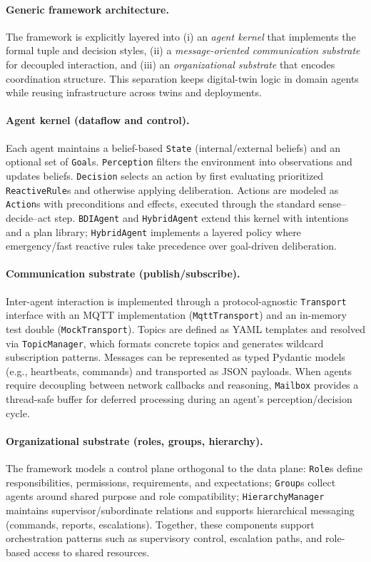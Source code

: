 \paragraph{Generic framework architecture.} The framework is explicitly layered into (i) an \emph{agent kernel} that implements the formal tuple and decision styles, (ii) a \emph{message-oriented communication substrate} for decoupled interaction, and (iii) an \emph{organizational substrate} that encodes coordination structure. This separation keeps digital-twin logic in domain agents while reusing infrastructure across twins and deployments.

\paragraph{Agent kernel (dataflow and control).} Each agent maintains a belief-based \texttt{State} (internal/external beliefs) and an optional set of \texttt{Goal}s. \texttt{Perception} filters the environment into observations and updates beliefs. \texttt{Decision} selects an action by first evaluating prioritized \texttt{ReactiveRule}s and otherwise applying deliberation. Actions are modeled as \texttt{Action}s with preconditions and effects, executed through the standard sense--decide--act step. \texttt{BDIAgent} and \texttt{HybridAgent} extend this kernel with intentions and a plan library; \texttt{HybridAgent} implements a layered policy where emergency/fast reactive rules take precedence over goal-driven deliberation.

\paragraph{Communication substrate (publish/subscribe).} Inter-agent interaction is implemented through a protocol-agnostic \texttt{Transport} interface with an MQTT implementation (\texttt{MqttTransport}) and an in-memory test double (\texttt{MockTransport}). Topics are defined as YAML templates and resolved via \texttt{TopicManager}, which formats concrete topics and generates wildcard subscription patterns. Messages can be represented as typed Pydantic models (e.g., heartbeats, commands) and transported as JSON payloads. When agents require decoupling between network callbacks and reasoning, \texttt{Mailbox} provides a thread-safe buffer for deferred processing during an agent’s perception/decision cycle.

\paragraph{Organizational substrate (roles, groups, hierarchy).} The framework models a control plane orthogonal to the data plane: \texttt{Role}s define responsibilities, permissions, requirements, and expectations; \texttt{Group}s collect agents around shared purpose and role compatibility; \texttt{HierarchyManager} maintains supervisor/subordinate relations and supports hierarchical messaging (commands, reports, escalations). Together, these components support orchestration patterns such as supervisory control, escalation paths, and role-based access to shared resources.


